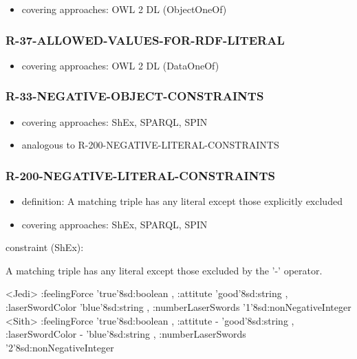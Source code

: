 \documentclass{llncs}
\begin{document}
\begin{itemize}
	\item covering approaches:  OWL 2 DL (ObjectOneOf) 
\end{itemize}

\subsubsection{R-37-ALLOWED-VALUES-FOR-RDF-LITERAL}

\begin{itemize}
	\item covering approaches:  OWL 2 DL (DataOneOf) 
\end{itemize}

\subsubsection{R-33-NEGATIVE-OBJECT-CONSTRAINTS}

\begin{itemize}
	\item covering approaches:  ShEx, SPARQL, SPIN
	\item analogous to R-200-NEGATIVE-LITERAL-CONSTRAINTS
\end{itemize}

\subsubsection{R-200-NEGATIVE-LITERAL-CONSTRAINTS}

\begin{itemize}
	\item definition: A matching triple has any literal except those explicitly excluded
	\item covering approaches:  ShEx, SPARQL, SPIN
\end{itemize}

constraint (ShEx):

A matching triple has any literal except those excluded by the '-' operator.

\begin{ex}
<Jedi> {
    :feelingForce 'true'^^xsd:boolean ,
    :attitute 'good'^^xsd:string ,
    :laserSwordColor 'blue'^^xsd:string ,
    :numberLaserSwords '1'^^xsd:nonNegativeInteger }
<Sith> {
    :feelingForce 'true'^^xsd:boolean ,
    :attitute - 'good'^^xsd:string ,
    :laserSwordColor - 'blue'^^xsd:string ,
    :numberLaserSwords '2'^^xsd:nonNegativeInteger }
\end{ex}
\end{document}
